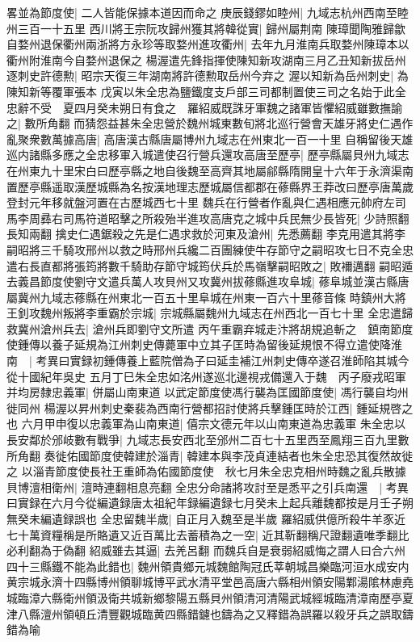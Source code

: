 畧並為節度使|{
	二人皆能保據本道因而命之}
庚辰錢鏐如睦州|{
	九域志杭州西南至睦州三百一十五里}
西川將王宗阮攻歸州獲其將韓從實|{
	歸州屬荆南}
陳璋聞陶雅歸歙自婺州退保衢州兩浙將方永珍等取婺州進攻衢州|{
	去年九月淮南兵取婺州陳璋本以衢州附淮南今自婺州退保之}
楊渥遣先鋒指揮使陳知新攻湖南三月乙丑知新拔岳州逐刺史許德勲|{
	昭宗天復三年湖南將許德勲取岳州今弃之}
渥以知新為岳州刺史|{
	為陳知新等覆軍張本}
戊寅以朱全忠為鹽鐵度支戶部三司都制置使三司之名始于此全忠辭不受　夏四月癸未朔日有食之　羅紹威既誅牙軍魏之諸軍皆懼紹威雖數撫諭之|{
	數所角翻}
而猜怨益甚朱全忠營於魏州城東數旬將北巡行營會天雄牙將史仁遇作亂聚衆數萬據高唐|{
	高唐漢古縣唐屬博州九域志在州東北一百一十里}
自稱留後天雄巡内諸縣多應之全忠移軍入城遣使召行營兵還攻高唐至歷亭|{
	歷亭縣屬貝州九域志在州東九十里宋白曰歷亭縣之地自後魏至高齊其地屬鄃縣隋開皇十六年于永濟渠南置歷亭縣遥取漢歷城縣為名按漢地理志歷城屬信都郡在蓚縣界王莽改曰歷亭唐萬歲登封元年移就盤河置在古歷城西七十里}
魏兵在行營者作亂與仁遇相應元帥府左司馬李周彞右司馬符道昭擊之所殺殆半進攻高唐克之城中兵民無少長皆死|{
	少詩照翻長知兩翻}
擒史仁遇鋸殺之先是仁遇求救於河東及滄州|{
	先悉薦翻}
李克用遣其將李嗣昭將三千騎攻邢州以救之時邢州兵纔二百團練使牛存節守之嗣昭攻七日不克全忠遣右長直都將張筠將數千騎助存節守城筠伏兵於馬嶺擊嗣昭敗之|{
	敗襧邁翻}
嗣昭遁去義昌節度使劉守文遣兵萬人攻貝州又攻冀州拔蓚縣進攻阜城|{
	蓚阜城並漢古縣唐屬冀州九域志蓚縣在州東北一百五十里阜城在州東一百六十里蓚音條}
時鎮州大將王釗攻魏州叛將李重霸於宗城|{
	宗城縣屬魏州九域志在州西北一百七十里}
全忠遣歸救冀州滄州兵去|{
	滄州兵即劉守文所遣}
丙午重霸弃城走汴將胡規追斬之　鎮南節度使鍾傳以養子延規為江州刺史傳薨軍中立其子匡時為留後延規恨不得立遣使降淮南　|{
	考異曰實録初鍾傳養上藍院僧為子曰延圭補江州刺史傳卒遂召淮師陷其城今從十國紀年吳史}
五月丁巳朱全忠如洺州遂巡北邊視戎備還入于魏　丙子廢戎昭軍并均房隸忠義軍|{
	併屬山南東道}
以武定節度使馮行襲為匡國節度使|{
	馮行襲自均州徙同州}
楊渥以昇州刺史秦裴為西南行營都招討使將兵擊鍾匡時於江西|{
	鍾延規啓之也}
六月甲申復以忠義軍為山南東道|{
	僖宗文德元年以山南東道為忠義軍}
朱全忠以長安鄰於邠岐數有戰爭|{
	九域志長安西北至邠州二百七十五里西至鳳翔三百九里數所角翻}
奏徙佑國節度使韓建於淄青|{
	韓建本與李茂貞連結者也朱全忠恐其復然故徙之}
以淄青節度使長社王重師為佑國節度使　秋七月朱全忠克相州時魏之亂兵散據貝博澶相衛州|{
	澶時連翻相息亮翻}
全忠分命諸將攻討至是悉平之引兵南還　|{
	考異曰實録在六月今從編遺録唐太祖紀年録編遺録七月癸未上起兵離魏都按是月壬子朔無癸未編遺録誤也}
全忠留魏半歲|{
	自正月入魏至是半歲}
羅紹威供億所殺牛羊豕近七十萬資糧稱是所賂遺又近百萬比去蓄積為之一空|{
	近其靳翻稱尺證翻遺唯季翻比必利翻為于偽翻}
紹威雖去其逼|{
	去羌呂翻}
而魏兵自是衰弱紹威悔之謂人曰合六州四十三縣鐵不能為此錯也|{
	魏州領貴鄉元城魏館陶冠氏莘朝城昌樂臨河洹水成安内黄宗城永濟十四縣博州領聊城博平武水清平堂邑高唐六縣相州領安陽鄴湯隂林慮堯城臨漳六縣衛州領汲衛共城新鄉黎陽五縣貝州領清河清陽武城經城臨清漳南歷亭夏津八縣澶州領頓丘清豐觀城臨黄四縣錯鑢也鑄為之又釋錯為誤羅以殺牙兵之誤取鑄錯為喻}
